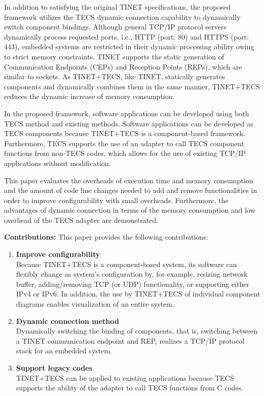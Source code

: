 \documentclass[conference]{IEEEtran/IEEEtran}
\begin{document}
In addition to satisfying the original TINET specifications, the proposed framework utilizes the TECS dynamic connection capability to dynamically switch component bindings.
Although general TCP/IP protocol servers dynamically process requested ports, i.e., HTTP (port: 80) and HTTPS (port: 443), embedded systems are restricted in their dynamic processing ability owing to strict memory constraints.
TINET supports the static generation of Communication Endpoints (CEPs) and Reception Points (REPs), which are similar to sockets.
As TINET+TECS, like TINET, statically generates components and dynamically combines them in the same manner, TINET+TECS reduces the dynamic increase of memory consumption.

In the proposed framework, software applications can be developed using both TECS method and existing methods.
Software applications can be developed as TECS components because TINET+TECS is a component-based framework.
Furthermore, TECS supports the use of an adapter to call TECS component functions from non-TECS codes, which allows for the use of existing TCP/IP applications without modification.

This paper evaluates the overheads of execution time and memory consumption and the amount of code line changes needed to add and remove functionalities in order to improve configurability with small overheads.
Furthermore, the advantages of dynamic connection in terms of the memory consumption and low overhead of the TECS adapter are demonstrated.

{\bf Contributions:} This paper provides the following contributions:

\begin{enumerate}

    \item {\bf Improve configurability}\mbox{}\\
        Because TINET+TECS is a component-based system, its software can flexibly change as system's configuration by, for example, resizing network buffer, adding/removing TCP (or UDP) functionality, or supporting either IPv4 or IPv6.
        In addition, the use by TINET+TECS of individual component diagrams enables visualization of an entire system.

    \item {\bf Dynamic connection method}\mbox{}\\
        Dynamically switching the binding of components, that is, switching between a TINET communication endpoint and REP, realizes a TCP/IP protocol stack for an embedded system.
        
    \item {\bf Support legacy codes}\mbox{}\\
        TINET+TECS can be applied to existing applications because TECS supports the ability of the adapter to call TECS functions from C codes. 

\end{enumerate}
\end{document}
